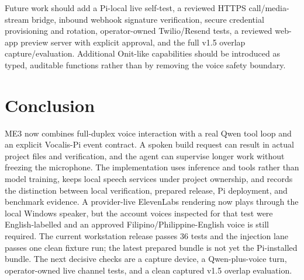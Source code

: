 \documentclass[sigconf,nonacm]{acmart}
\begin{document}
Future work should add a Pi-local live self-test, a reviewed HTTPS
call/media-stream bridge, inbound webhook signature verification, secure
credential provisioning and rotation, operator-owned Twilio/Resend tests, a
reviewed web-app preview server with explicit approval, and the full v1.5
overlap capture/evaluation. Additional Onit-like capabilities should be
introduced as typed, auditable functions rather than by removing the voice
safety boundary.

\section{Conclusion}

\noindent ME3 now combines full-duplex voice interaction with a real Qwen tool loop and
an explicit Vocalis-Pi event contract. A
spoken build request can result in actual project files and verification, and
the agent can supervise longer work without freezing the microphone. The
implementation uses inference and tools rather than model training, keeps
local speech services under project ownership, and records the distinction
between local verification, prepared release, Pi deployment, and benchmark
evidence. A provider-live ElevenLabs rendering now plays through the local
Windows speaker, but the account voices inspected for that test were
English-labelled and an approved Filipino/Philippine-English voice is still
required. The current workstation release passes 36 tests and the injection
lane passes one clean fixture run; the latest prepared bundle is not yet the
Pi-installed bundle. The next decisive checks are a capture device, a
Qwen-plus-voice turn, operator-owned live channel tests, and a clean captured
v1.5 overlap evaluation.
\end{document}
